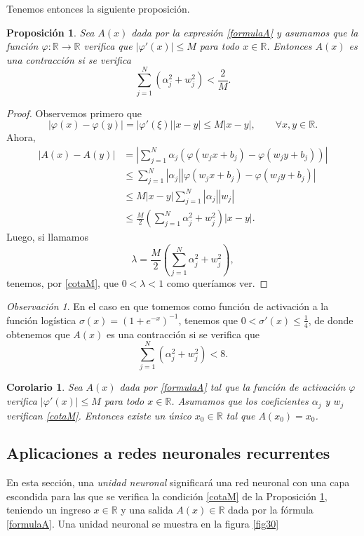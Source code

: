 \documentclass[12pt, a4paper]{amsbook}
\newcommand{\R}{{\mathbb R}}
\newtheorem{prop}[teo]{Proposici\'on}
\newtheorem{cor}[teo]{Corolario}
\theoremstyle{remark}
\newtheorem{obs}[teo]{Observaci\'on}
\theoremstyle{definition}
\numberwithin{section}{chapter}
\numberwithin{subsection}{section}
\numberwithin{equation}{section}
\numberwithin{figure}{chapter}
\begin{document}
Tenemos entonces la siguiente proposición.
\begin{prop}\label{A.contraccion}
Sea $A(x)$ dada por la expresión \eqref{formulaA} y asumamos que la función $\varphi\colon \R\to\R$ verifica que $|\varphi'(x)|\le M$ para todo $x\in\R$. Entonces $A(x)$ es una contracción si se verifica
\begin{equation}\label{cotaM}
\sum_{j=1}^N (\alpha_j^2 + w_j^2) < \frac{2}{M}.
\end{equation}
\end{prop}

\begin{proof}
Observemos primero que
$$
|\varphi(x)-\varphi(y)|=|\varphi'(\xi)||x-y|\le M|x-y|,\qquad \forall x, y\in\R.
$$
Ahora,
\begin{align*}
|A(x)-A(y)| &= \left|\sum_{j=1}^N \alpha_j (\varphi(w_j x + b_j) - \varphi(w_j y + b_j))\right|\\
&\le \sum_{j=1}^N |\alpha_j| |\varphi(w_j x + b_j) - \varphi(w_j y + b_j)|\\
&\le M|x-y|\sum_{j=1}^N |\alpha_j||w_j|\\
&\le  \frac{M}{2}\left(\sum_{j=1}^N \alpha_j^2 + w_j^2 \right) |x-y|.
\end{align*}
Luego, si llamamos
$$
\lambda = \frac{M}{2}\left(\sum_{j=1}^N \alpha_j^2 + w_j^2 \right),
$$
tenemos, por \eqref{cotaM}, que $0<\lambda<1$ como queríamos ver.
\end{proof}

\begin{obs}
En el caso en que tomemos como función de activación a la función logística $\sigma(x) = (1+e^{-x})^{-1}$, tenemos que $0<\sigma'(x)\le \frac14$, de donde obtenemos que $A(x)$ es una contracción si se verifica que
$$
\sum_{j=1}^N (\alpha_j^2 + w_j^2) < 8.
$$
\end{obs}

\begin{cor}
Sea $A(x)$ dada por \eqref{formulaA} tal que la función de activación $\varphi$ verifica $|\varphi'(x)|\le M$ para todo $x\in\R$. Asumamos que los coeficientes $\alpha_j$ y $w_j$ verifican \eqref{cotaM}. Entonces existe un único $x_0\in \R$ tal que $A(x_0)=x_0$.
\end{cor}

\subsection{Aplicaciones a redes neuronales recurrentes}
En esta sección, una {\em unidad neuronal} significará una red neuronal con una capa escondida para las que se verifica la condición \eqref{cotaM} de la Proposición \ref{A.contraccion}, teniendo un ingreso $x\in\R$ y una salida $A(x)\in\R$ dada por la fórmula \eqref{formulaA}. Una unidad neuronal se muestra en la figura \ref{fig30}
\end{document}
